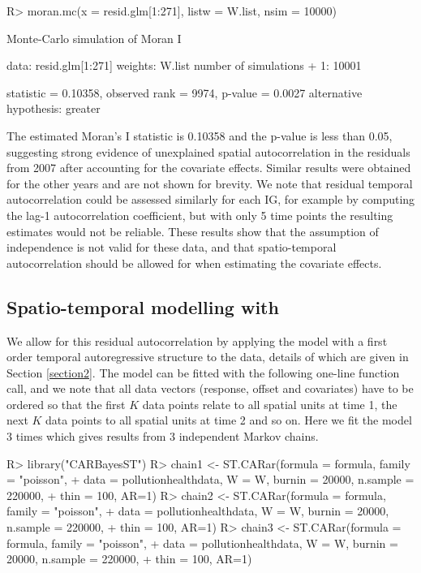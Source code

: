 \documentclass[article, nojss]{jss}
\begin{document}
\begin{Schunk}
\begin{Sinput}
R>  moran.mc(x = resid.glm[1:271], listw = W.list, nsim = 10000)
\end{Sinput}
\begin{Soutput}
	Monte-Carlo simulation of Moran I

data:  resid.glm[1:271] 
weights: W.list  
number of simulations + 1: 10001 

statistic = 0.10358, observed rank = 9974, p-value = 0.0027
alternative hypothesis: greater
\end{Soutput}
\end{Schunk}

The estimated Moran's I statistic is 0.10358 and the p-value is less than 0.05, suggesting strong evidence of unexplained spatial autocorrelation in the residuals from 2007 after accounting for the covariate effects. Similar results were obtained for the other years and are not shown for brevity. We note that residual temporal autocorrelation could be assessed similarly for each IG, for example by computing the lag-1 autocorrelation coefficient, but with only 5 time points the resulting estimates would not be reliable. These results show that the assumption of independence is not valid for these data, and that spatio-temporal autocorrelation should be allowed for when estimating the covariate effects. 


\subsection[Spatio-temporal modelling with CARBayesST]{Spatio-temporal modelling with }
We allow for this residual autocorrelation by applying the  model with a first order temporal autoregressive structure to the data, details of which are given in Section \ref{section2}. The model can be fitted with the following one-line function call, and we note that all data vectors (response, offset and covariates) have to be ordered so that the first $K$ data points relate to all spatial units at time 1, the next $K$ data points to all spatial units at time 2 and so on. Here we fit the model 3 times which gives results from 3 independent Markov chains.


\begin{CodeInput}
R>  library("CARBayesST")
R>  chain1 <- ST.CARar(formula = formula, family = "poisson", 
+       data = pollutionhealthdata, W = W, burnin = 20000, n.sample = 220000, 
+       thin = 100, AR=1)
R>  chain2 <- ST.CARar(formula = formula, family = "poisson", 
+       data = pollutionhealthdata, W = W, burnin = 20000, n.sample = 220000, 
+       thin = 100, AR=1)
R>  chain3 <- ST.CARar(formula = formula, family = "poisson", 
+       data = pollutionhealthdata, W = W, burnin = 20000, n.sample = 220000, 
+       thin = 100, AR=1)
\end{CodeInput}
\end{document}
